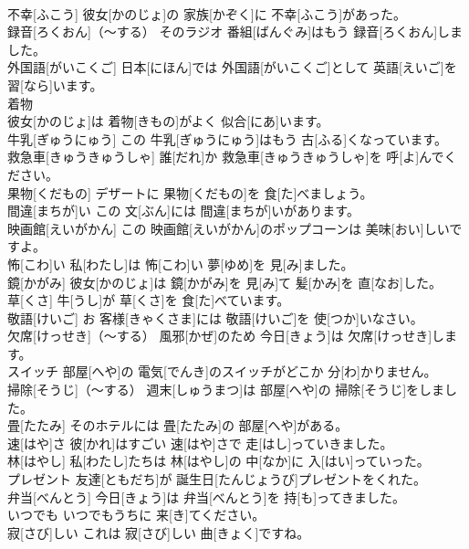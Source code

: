 \documentclass[8pt]{extreport}
\begin{document}
\begin{CJK}{UTF8}{min}
\\	不幸[ふこう]	彼女[かのじょ]の 家族[かぞく]に 不幸[ふこう]があった。		
\\	録音[ろくおん]（～する）	そのラジオ 番組[ばんぐみ]はもう 録音[ろくおん]しました。		
\\	外国語[がいこくご]	日本[にほん]では 外国語[がいこくご]として 英語[えいご]を 習[なら]います。		
\\	着物
\\	[きもの]	彼女[かのじょ]は 着物[きもの]がよく 似合[にあ]います。		
\\	牛乳[ぎゅうにゅう]	この 牛乳[ぎゅうにゅう]はもう 古[ふる]くなっています。		
\\	救急車[きゅうきゅうしゃ]	誰[だれ]か 救急車[きゅうきゅうしゃ]を 呼[よ]んでください。		
\\	果物[くだもの]	デザートに 果物[くだもの]を 食[た]べましょう。		
\\	間違[まちが]い	この 文[ぶん]には 間違[まちが]いがあります。		
\\	映画館[えいがかん]	この 映画館[えいがかん]のポップコーンは 美味[おい]しいですよ。		
\\	怖[こわ]い	私[わたし]は 怖[こわ]い 夢[ゆめ]を 見[み]ました。		
\\	鏡[かがみ]	彼女[かのじょ]は 鏡[かがみ]を 見[み]て 髪[かみ]を 直[なお]した。		
\\	草[くさ]	牛[うし]が 草[くさ]を 食[た]べています。		
\\	敬語[けいご]	お 客様[きゃくさま]には 敬語[けいご]を 使[つか]いなさい。		
\\	欠席[けっせき]（～する）	風邪[かぜ]のため 今日[きょう]は 欠席[けっせき]します。		
\\	スイッチ	部屋[へや]の 電気[でんき]のスイッチがどこか 分[わ]かりません。		
\\	掃除[そうじ]（～する）	週末[しゅうまつ]は 部屋[へや]の 掃除[そうじ]をしました。		
\\	畳[たたみ]	そのホテルには 畳[たたみ]の 部屋[へや]がある。		
\\	速[はや]さ	彼[かれ]はすごい 速[はや]さで 走[はし]っていきました。		
\\	林[はやし]	私[わたし]たちは 林[はやし]の 中[なか]に 入[はい]っていった。		
\\	プレゼント	友達[ともだち]が 誕生日[たんじょうび]プレゼントをくれた。		
\\	弁当[べんとう]	今日[きょう]は 弁当[べんとう]を 持[も]ってきました。		
\\	いつでも	いつでもうちに 来[き]てください。		
\\	寂[さび]しい	これは 寂[さび]しい 曲[きょく]ですね。		

\end{CJK}
\end{document}

